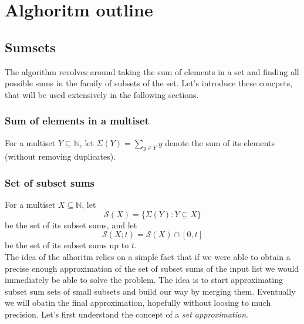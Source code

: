 \section{Alghoritm outline}

\subsection{Sumsets}
The algorithm revolves around taking the sum of elements in a set and finding all possible sums in the family of subsets of the set. Let's introduce these concpets, that will be used extensively in the following sections.
\subsubsection{Sum of elements in a multiset}
For a multiset \( Y \subseteq \mathbb{N} \), let \( \Sigma(Y) = \sum_{y \in Y} y \) denote the sum of its elements (without removing duplicates).
\subsubsection {Set of subset sums}
For a multiset \( X \subseteq \mathbb{N} \), let 
\[ 
    \mathcal{S}(X) = \{ \Sigma(Y) : Y \subseteq X \} 
\] be the set of its subset sums, and let 
\[ 
    \mathcal{S}(X; t) = \mathcal{S}(X) \cap [0, t] 
\] be the set of its subset sums up to \( t \). \\ 

The idea of the alhoritm relies on a simple fact that if we were able to obtain a precise enough approximation of the set of subset sums of the input list we would immediately be able to solve the \Partition problem. The idea is to start approximating subset sum sets of small subsets and build our way by merging them. Eventually we will obatin the final approximation, hopefully without loosing to much precision. Let's first understand the concept of a \textit{set approximation}.
